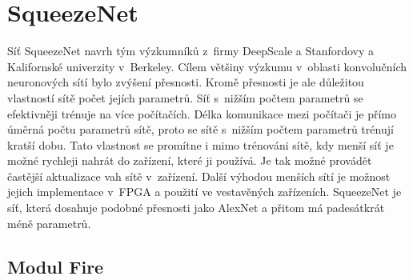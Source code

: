 \begin{table}
\centering
{}
\caption{Struktura postranního klasifikátoru sítě GoogLeNet, který je popsán v~podsekci \ref{sub:googlenet_desc}.}
\label{table:auxiliary_classifier}
\end{table}

\section{SqueezeNet}
\label{sec:SqueezeNet}

Síť SqueezeNet navrh tým výzkumníků z~firmy DeepScale a Stanfordovy a Kalifornské univerzity v~Berkeley\cite{Iandola2016}.
Cílem většiny výzkumu v~oblasti konvolučních neuronových sítí bylo zvýšení přesnosti.
Kromě přesnosti je ale důležitou vlastností sítě počet jejích parametrů.
Síť s~nižším počtem parametrů se efektivněji trénuje na více počítačích.
Délka komunikace mezi počítači je přímo úměrná počtu parametrů sítě, proto se sítě s~nižším počtem parametrů trénují kratší dobu.
Tato vlastnost se promítne i mimo trénováni sítě, kdy menší síť je možné rychleji nahrát do zařízení, které ji používá.
Je tak možné provádět častější aktualizace vah sítě v~zařízení.
Další výhodou menších sítí je možnost jejich implementace v~FPGA a použití ve vestavěných zařízeních.
SqueezeNet je síť, která dosahuje podobné přesnosti jako AlexNet a přitom má padesátkrát méně parametrů.

\subsection{Modul Fire}
\label{sub:fire_module}

